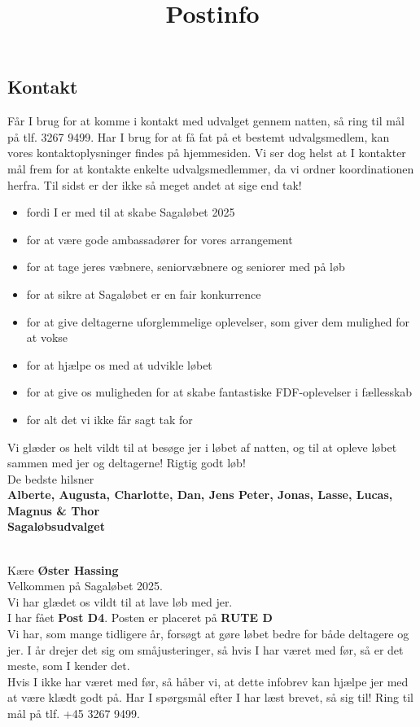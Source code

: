 \subsection{Kontakt}
Får I brug for at komme i kontakt med udvalget gennem natten, så ring til mål på tlf. 3267 9499. Har I brug for at få fat på et bestemt udvalgsmedlem, kan vores kontaktoplysninger findes på hjemmesiden. Vi ser dog helst at I kontakter mål frem for at kontakte enkelte udvalgsmedlemmer, da vi ordner koordinationen herfra.
\newline
Til sidst er der ikke så meget andet at sige end tak!\begin{itemize}
  \item fordi I er med til at skabe Sagaløbet 2025
  \item for at være gode ambassadører for vores arrangement
  \item for at tage jeres væbnere, seniorvæbnere og seniorer med på løb
  \item for at sikre at Sagaløbet er en fair konkurrence
  \item for at give deltagerne uforglemmelige oplevelser, som giver dem mulighed for at vokse
  \item for at hjælpe os med at udvikle løbet
  \item for at give os muligheden for at skabe fantastiske FDF-oplevelser i fællesskab
  \item for alt det vi ikke får sagt tak for
\end{itemize}
Vi glæder os helt vildt til at besøge jer i løbet af natten, og til at opleve løbet sammen med jer og deltagerne!
\newline
Rigtig godt løb!\\
\newline
\textcolor{søblå}{De bedste hilsner}\\
\textcolor{natblå}{\textbf{Alberte, Augusta, Charlotte, Dan, Jens Peter, Jonas, Lasse, Lucas, Magnus \& Thor}}\\
\textcolor{natblå}{\textbf{Sagaløbsudvalget}}\\
\newpage
\title{Postinfo}\\
Kære \textbf{Øster Hassing}\\
\newline
Velkommen på Sagaløbet 2025.\\
Vi har glædet os vildt til at lave løb med jer.\\
\newline
I har fået \textbf{Post D4}. Posten er placeret på \textbf{RUTE D}\\
Vi har, som mange tidligere år, forsøgt at gøre løbet bedre for både deltagere og jer. I år drejer det sig om småjusteringer, så hvis I har været med før, så er det meste, som I kender det.\\
\newline
Hvis I ikke har været med før, så håber vi, at dette infobrev kan hjælpe jer med at være klædt godt på. Har I spørgsmål efter I har læst brevet, så sig til! Ring til mål på tlf. +45 3267 9499.
